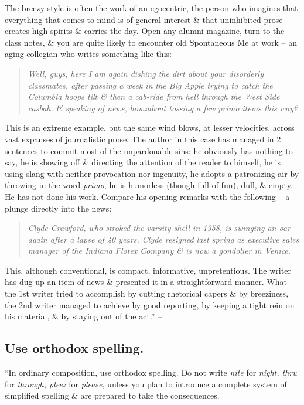 \documentclass{article}
\numberwithin{equation}{section}
\begin{document}
The breezy style is often the work of an egocentric, the person who imagines that everything that comes to mind is of general interest \& that uninhibited prose creates high spirits \& carries the day. Open any alumni magazine, turn to the class notes, \& you are quite likely to encounter old Spontaneous Me at work -- an aging collegian who writes something like this:
\begin{quotation}\it
	Well, guys, here I am again dishing the dirt about your disorderly classmates, after passing a week in the Big Apple trying to catch the Columbia hoops tilt \& then a cab-ride from hell through the West Side casbah. \& speaking of news, howzabout tossing a few primo items this way?
\end{quotation}
This is an extreme example, but the same wind blows, at lesser velocities, across vast expanses of journalistic prose. The author in this case has managed in 2 sentences to commit most of the unpardonable sins: he obviously has nothing to say, he is showing off \& directing the attention of the reader to himself, he is using slang with neither provocation nor ingenuity, he adopts a patronizing air by throwing in the word \textit{primo}, he is humorless (though full of fun), dull, \& empty. He has not done his work. Compare his opening remarks with the following -- a plunge directly into the news:
\begin{quotation}\it
	Clyde Crawford, who stroked the varsity shell in 1958, is swinging an oar again after a lapse of 40 years. Clyde resigned last spring as executive sales manager of the Indiana Flotex Company \& is now a gondolier in Venice.
\end{quotation}
This, although conventional, is compact, informative, unpretentious. The writer has dug up an item of news \& presented it in a straightforward manner. What the 1st writer tried to accomplish by cutting rhetorical capers \& by breeziness, the 2nd writer managed to achieve by good reporting, by keeping a tight rein on his material, \& by staying out of the act.'' -- \cite[p. 87]{Strunk_White2019}


\subsection{Use orthodox spelling.}
``In ordinary composition, use orthodox spelling. Do not write \textit{nite} for \textit{night, thru} for \textit{through, pleez} for \textit{please}, unless you plan to introduce a complete system of simplified spelling \& are prepared to take the consequences.
\end{document}

